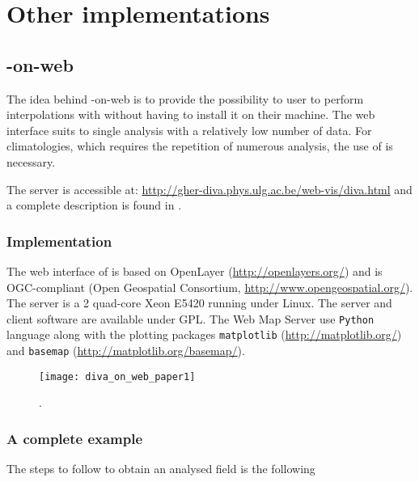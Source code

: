 \chapter{Other implementations\label{chap:divaonweb}}

\lettrine[lines=2, loversize=-0.1, lraise=0.1]{}{} 

\minitoc

\newpage %

\section{\diva-on-web}

The idea behind \diva-on-web is to provide the possibility to user to perform interpolations with \diva without having to install it on their machine. The web interface suits to single analysis with a relatively low number of data. For climatologies, which requires the repetition of numerous analysis, the use of \diva is necessary.

The server is accessible at: \url{http://gher-diva.phys.ulg.ac.be/web-vis/diva.html} and a complete description is found in \citet{BARTH10}.


\subsection{Implementation}

The web interface of \diva is based on OpenLayer (\url{http://openlayers.org/}) and is OGC-compliant (Open Geospatial Consortium, \url{http://www.opengeospatial.org/}). The server is a 2 quad-core Xeon E5420 running under Linux. The server and client software are available under GPL. The Web Map Server use \texttt{Python} language along with the plotting packages \texttt{matplotlib} (\url{http://matplotlib.org/}) and \texttt{basemap} (\url{http://matplotlib.org/basemap/}). 

\begin{figure}[htpb]
	\centering
	\parbox{.5\textwidth}{
		\texttt{[image: diva\_on\_web\_paper1]}
		}\parbox{.5\textwidth}{
		\caption{.\label{fig:diva_on_web_paper1}}
		}
\end{figure}

\subsection{A complete example}

The steps to follow to obtain an analysed field is the following

